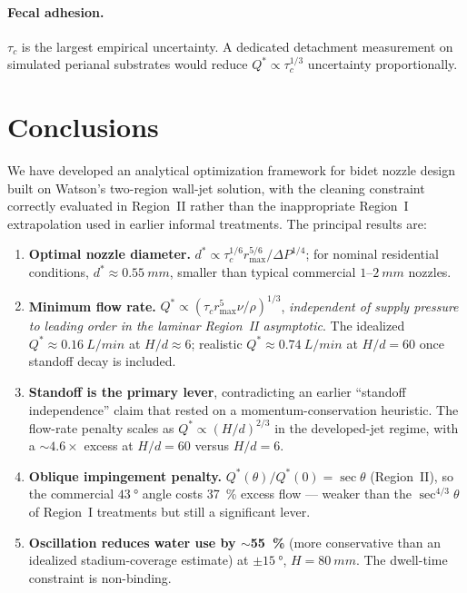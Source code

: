 \documentclass[aps,prfluids,reprint,amsmath,amssymb,floatfix]{revtex4-2}
\begin{document}
\paragraph{Fecal adhesion.}
$\tau_c$ is the largest empirical uncertainty. A dedicated detachment
measurement on simulated perianal substrates would reduce
$Q^* \propto \tau_c^{1/3}$ uncertainty proportionally.

\section{Conclusions}
\label{sec:conclusions}

We have developed an analytical optimization framework for bidet nozzle
design built on Watson's two-region wall-jet solution, with the cleaning
constraint correctly evaluated in Region~II rather than the inappropriate
Region~I extrapolation used in earlier informal treatments. The principal
results are:

\begin{enumerate}[leftmargin=*, itemsep=4pt]
  \item \textbf{Optimal nozzle diameter.}
  $d^* \propto \tau_c^{1/6} r_\mathrm{max}^{5/6}/\Delta P^{1/4}$;
  for nominal residential conditions, $d^* \approx \SI{0.55}{mm}$,
  smaller than typical commercial $1$--$\SI{2}{mm}$ nozzles.

  \item \textbf{Minimum flow rate.}
  $Q^* \propto (\tau_c r_\mathrm{max}^5 \nu/\rho)^{1/3}$, \emph{independent
  of supply pressure to leading order in the laminar Region~II asymptotic}.
  The idealized $Q^* \approx \SI{0.16}{L/min}$ at $H/d \approx 6$;
  realistic $Q^* \approx \SI{0.74}{L/min}$ at $H/d = 60$ once standoff
  decay is included.

  \item \textbf{Standoff is the primary lever}, contradicting an earlier
  ``standoff independence'' claim that rested on a momentum-conservation
  heuristic. The flow-rate penalty scales as $Q^* \propto (H/d)^{2/3}$
  in the developed-jet regime, with a $\sim 4.6\times$ excess at $H/d = 60$
  versus $H/d = 6$.

  \item \textbf{Oblique impingement penalty.}
  $Q^*(\theta)/Q^*(0) = \sec\theta$ (Region~II), so the commercial
  $\SI{43}{\degree}$ angle costs \SI{37}{\percent} excess flow ---
  weaker than the $\sec^{4/3}\theta$ of Region~I treatments but still
  a significant lever.

  \item \textbf{Oscillation reduces water use by $\sim$\SI{55}{\percent}}
  (more conservative than an idealized stadium-coverage estimate)
  at $\pm\SI{15}{\degree}$, $H = \SI{80}{mm}$. The dwell-time constraint
  is non-binding.
\end{enumerate}
\end{document}

